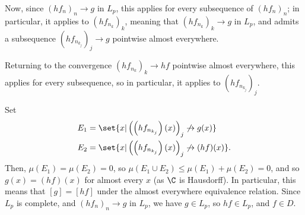 \documentclass[10pt]{mypackage}
\begin{document}
\begin{enumerate}[(a)]
    Now, since $\left( hf_n \right)_n\rightarrow g$ in $L_p$, this applies for every subsequence of $\left( hf_n \right)_n$; in particular, it applies to $\left( hf_{n_{k}} \right)_k$, meaning that $\left( hf_{n_{k}} \right)_k\rightarrow g$ in $L_p$, and admits a subsequence $\left( hf_{n_{k_{j}}} \right)_j\rightarrow g$ pointwise almost everywhere.\newline

    Returning to the convergence $\left( hf_{n_{k}} \right)_k\rightarrow hf$ pointwise almost everywhere, this applies for every subsequence, so in particular, it applies to $\left( hf_{n_{k_{j}}} \right)_j$.\newline

    Set
    \begin{align*}
      E_1 &= \set{x | \left( \left( hf_{n_{k_{j}}} \right)(x) \right)_j\not\rightarrow g(x)}\\
      E_2 &= \set{x | \left( \left( hf_{n_{k_{j}}} \right)(x) \right)_{j}\not\rightarrow (hf)(x)}.
    \end{align*}
    Then, $\mu\left( E_1 \right) = \mu\left( E_2 \right) = 0$, so $\mu\left( E_1\cup E_2 \right) \leq \mu\left( E_1 \right) + \mu\left( E_2 \right) = 0$, and so $g(x) = \left( hf \right)(x)$ for almost every $x$ (as $\C$ is Hausdorff). In particular, this means that $\left[ g \right] = \left[ hf \right]$ under the almost everywhere equivalence relation. Since $L_p$ is complete, and $\left( hf_n \right)_n\rightarrow g$ in $L_p$, we have $g\in L_p$, so $hf\in L_p$, and $f\in D$.
\end{enumerate}
\end{document}
